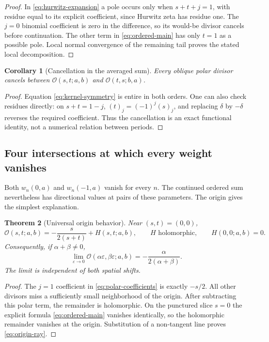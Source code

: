 \documentclass[11pt,a4paper]{article}
\numberwithin{equation}{section}
\newtheorem{theorem}{Theorem}[section]
\newtheorem{corollary}[theorem]{Corollary}
\theoremstyle{definition}
\theoremstyle{remark}
\newcommand{\Ord}{\mathcal O}
\begin{document}
\begin{proof}
In \eqref{eq:hurwitz-expansion} a pole occurs only when
$s+t+j=1$, with residue equal to its explicit coefficient, since
Hurwitz zeta has residue one. The $j=0$ binomial coefficient is zero
in the difference, so its would-be divisor cancels before
continuation. The other term in \eqref{eq:ordered-main} has only
$t=1$ as a possible pole. Local normal convergence of the remaining
tail proves the stated local decomposition.
\end{proof}

\begin{corollary}[Cancellation in the averaged sum]\label{cor:pole-cancellation}
Every oblique polar divisor cancels between $\Ord(s,t;a,b)$ and
$\Ord(t,s;b,a)$.
\end{corollary}
\begin{proof}
Equation \eqref{eq:kernel-symmetry} is entire in both orders. One
can also check residues directly: on $s+t=1-j$,
$(t)_j=(-1)^j(s)_j$, and replacing $\delta$ by $-\delta$
reverses the required coefficient. Thus the cancellation is an exact
functional identity, not a numerical relation between periods.
\end{proof}

\subsection{Four intersections at which every weight vanishes}

Both $w_n(0,a)$ and $w_n(-1,a)$ vanish for every $n$. The continued
ordered sum nevertheless has directional values at pairs of these
parameters. The origin gives the simplest explanation.

\begin{theorem}[Universal origin behavior]\label{thm:origin}
Near $(s,t)=(0,0)$,
\begin{equation}\label{eq:origin-germ}
 \Ord(s,t;a,b)=-\frac{s}{2(s+t)}+H(s,t;a,b),
 \qquad H\text{ holomorphic},\qquad H(0,0;a,b)=0.
\end{equation}
Consequently, if $\alpha+\beta\ne0$,
\begin{equation}\label{eq:origin-ray}
 \lim_{\varepsilon\to0}
 \Ord(\alpha\varepsilon,\beta\varepsilon;a,b)
        =-\frac{\alpha}{2(\alpha+\beta)}.
\end{equation}
The limit is independent of both spatial shifts.
\end{theorem}

\begin{proof}
The $j=1$ coefficient in \eqref{eq:polar-coefficients} is exactly
$-s/2$. All other divisors miss a sufficiently small neighborhood
of the origin. After subtracting this polar term, the remainder
is holomorphic. On the punctured slice $s=0$ the explicit
formula \eqref{eq:ordered-main} vanishes identically, so the
holomorphic remainder vanishes at the origin. Substitution of a
non-tangent line proves \eqref{eq:origin-ray}.
\end{proof}
\end{document}
